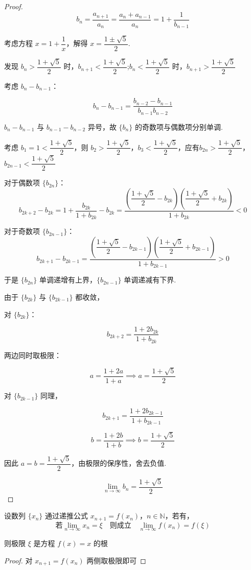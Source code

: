 \begin{proof}
	\[
	b_n = \frac{a_{n+1}}{a_n} = \frac{a_n + a_{n-1}}{a_n} = 1 + \frac{1}{b_{n-1}}
	\]
	
	考虑方程 $x = 1 + \dfrac{1}{x}$，解得 $x = \dfrac{1 \pm \sqrt{5}}{2}$.
	
	发现 $b_n > \dfrac{1+\sqrt{5}}{2}$ 时，$b_{n+1} < \dfrac{1+\sqrt{5}}{2}$;$b_n < \dfrac{1+\sqrt{5}}{2}$ 时，$b_{n+1} > \dfrac{1+\sqrt{5}}{2}$
	
	考虑 $b_n - b_{n-1}$：
	
	\[
	b_n - b_{n-1} = \frac{b_{n-2} - b_{n-1}}{b_{n-1} b_{n-2}}
	\]
	
	$b_n - b_{n-1}$ 与 $b_{n-1} - b_{n-2}$ 异号，故 $\{b_{n}\}$ 的奇数项与偶数项分别单调.
	
	考虑 $b_1 = 1 < \dfrac{1+\sqrt{5}}{2}$，则 $b_{2} > \dfrac{1+\sqrt{5}}{2}$，$b_{3} < \dfrac{1+\sqrt{5}}{2}$，应有$b_{2n} > \dfrac{1+\sqrt{5}}{2}$，$b_{2n-1} < \dfrac{1+\sqrt{5}}{2}$
	
	对于偶数项 $\{b_{2n}\}$：
	\[b_{2k+2} - b_{2k} = 1 + \frac{b_{2k}}{1 + b_{2k}} - b_{2k} = \dfrac{(\dfrac{1+\sqrt{5}}{2} - b_{2k})(\dfrac{1+\sqrt{5}}{2} + b_{2k})}{1 + b_{2k}} < 0\]
	
	对于奇数项 $\{b_{2n-1}\}$：
	\[
	b_{2k+1} - b_{2k-1} = \dfrac{(\dfrac{1+\sqrt{5}}{2} - b_{2k-1})(\dfrac{1+\sqrt{5}}{2} + b_{2k-1})}{1 + b_{2k-1}} > 0
	\]
	
	于是 $\{b_{2n}\}$ 单调递增有上界，$\{b_{2n-1}\}$ 单调递减有下界.
	
	由于 $\{b_{2k}\}$ 与 $\{b_{2k-1}\}$ 都收敛，
	
	对 $\{b_{2k}\}$：
	
	\[
	b_{2k+2} = \frac{1 + 2b_{2k}}{1 + b_{2k}}
	\]
	
	两边同时取极限：
	
	\[
	a = \frac{1 + 2a}{1 + a} \implies a = \frac{1 + \sqrt{5}}{2}
	\]
	
	对 $\{b_{2k-1}\}$ 同理，
	
	\[
	b_{2k+1} = \frac{1 + 2b_{2k-1}}{1 + b_{2k-1}}
	\]
	
	\[
	b = \frac{1 + 2b}{1 + b} \implies b = \frac{1 + \sqrt{5}}{2}
	\]
	
	因此 $a = b = \dfrac{1 + \sqrt{5}}{2}$，由极限的保序性，舍去负值.
	
	\[
	\lim_{n \to \infty} b_n = \frac{1 + \sqrt{5}}{2}
	\]
	
\end{proof}
\begin{proposition}
	设数列 $\{x_n\}$ 通过递推公式 $x_{n+1} = f(x_n)$，$n \in \mathbb{N}$，若有，
	\[
	\text{若}\lim_{n \to \infty} x_n = \xi \quad \text{则成立} \quad \lim_{n \to \infty} f(x_n) = f(\xi)
	\]
	
	则极限 $\xi$ 是方程 $f(x) = x$ 的根
\end{proposition}
\begin{proof}
	对 $x_{n+1} = f(x_n)$ 两侧取极限即可
	
\end{proof}

